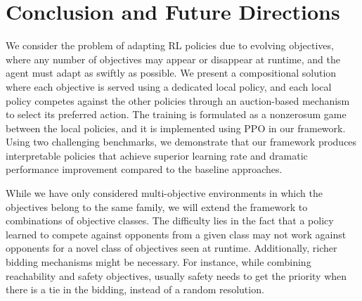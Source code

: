 \section{Conclusion and Future Directions}
We consider the problem of adapting RL policies due to evolving objectives, where any number of objectives may appear or disappear at runtime, and the agent must adapt as swiftly as possible.
We present a compositional solution where each objective is served using a dedicated local policy, and each local policy competes against the other policies through an auction-based mechanism to select its preferred action.
The training is formulated as a nonzerosum game between the local policies, and it is implemented using PPO in our framework.
Using two challenging benchmarks, we demonstrate that our framework produces interpretable policies that achieve superior learning rate and  dramatic performance improvement compared to the baseline approaches.

While we have only considered multi-objective environments in which the objectives belong to the same family, we will extend the framework to combinations of objective classes. 
The difficulty lies in the fact that a policy learned to compete against opponents from a given class may not work against opponents for a novel class of objectives seen at runtime.
Additionally, richer bidding mechanisms might be necessary. 
For instance, while combining reachability and safety objectives, usually safety needs to get the priority when there is a tie in the bidding, instead of a random resolution.
